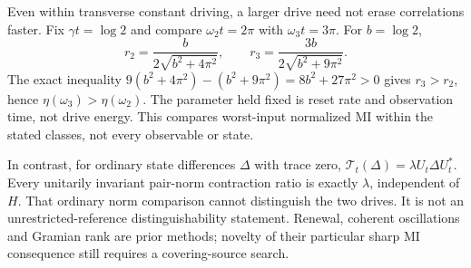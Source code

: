 \documentclass[11pt]{article}
\begin{document}
Even within transverse constant driving, a larger drive need not erase correlations faster. Fix $\gamma t=\log2$ and compare $\omega_2t=2\pi$ with $\omega_3t=3\pi$. For $b=\log2$,
\[
 r_2=\frac{b}{2\sqrt{b^2+4\pi^2}},\qquad
 r_3=\frac{3b}{2\sqrt{b^2+9\pi^2}}.
\]
The exact inequality $9(b^2+4\pi^2)-(b^2+9\pi^2)=8b^2+27\pi^2>0$ gives $r_3>r_2$, hence $\eta(\omega_3)>\eta(\omega_2)$. The parameter held fixed is reset rate and observation time, not drive energy. This compares worst-input normalized MI within the stated classes, not every observable or state.

In contrast, for ordinary state differences $\Delta$ with trace zero,
$\mathcal T_t(\Delta)=\lambda U_t\Delta U_t^*$. Every unitarily invariant pair-norm contraction ratio is exactly $\lambda$, independent of $H$. That ordinary norm comparison cannot distinguish the two drives. It is not an unrestricted-reference distinguishability statement. Renewal, coherent oscillations and Gramian rank are prior methods; novelty of their particular sharp MI consequence still requires a covering-source search.
\end{document}
